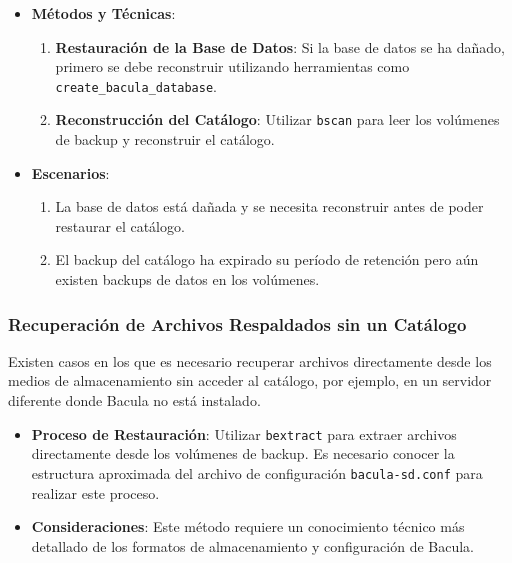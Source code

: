 \begin{itemize}
    \item \textbf{Métodos y Técnicas}:
        \begin{enumerate}
            \item \textbf{Restauración de la Base de Datos}: Si la base de datos se ha dañado, primero se debe reconstruir utilizando herramientas como \texttt{create\_bacula\_database}.
            \item \textbf{Reconstrucción del Catálogo}: Utilizar \texttt{bscan} para leer los volúmenes de backup y reconstruir el catálogo.
        \end{enumerate}
    \item \textbf{Escenarios}:
        \begin{enumerate}
            \item La base de datos está dañada y se necesita reconstruir antes de poder restaurar el catálogo.
            \item El backup del catálogo ha expirado su período de retención pero aún existen backups de datos en los volúmenes.
        \end{enumerate}
\end{itemize}

\subsubsection{Recuperación de Archivos Respaldados sin un Catálogo}

Existen casos en los que es necesario recuperar archivos directamente desde los medios de almacenamiento sin acceder al catálogo, por ejemplo, en un servidor diferente donde Bacula no está instalado.

\begin{itemize}
    \item \textbf{Proceso de Restauración}: Utilizar \texttt{bextract} para extraer archivos directamente desde los volúmenes de backup. Es necesario conocer la estructura aproximada del archivo de configuración \texttt{bacula-sd.conf} para realizar este proceso.
    \item \textbf{Consideraciones}: Este método requiere un conocimiento técnico más detallado de los formatos de almacenamiento y configuración de Bacula.
\end{itemize}


